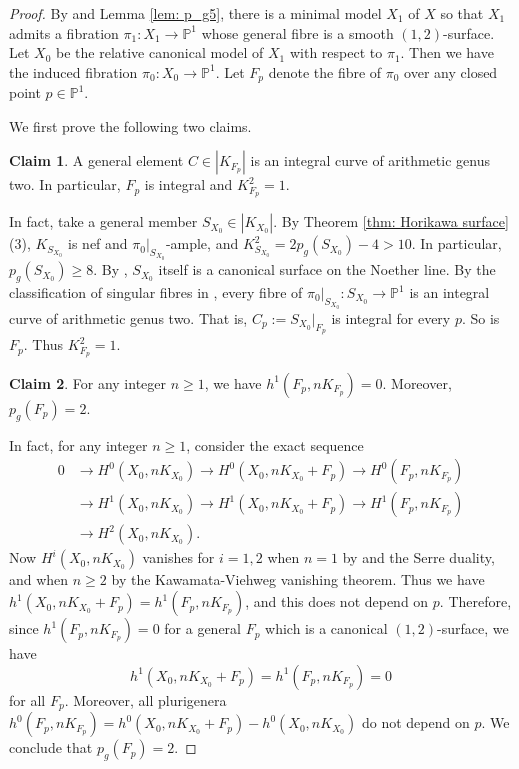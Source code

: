 \documentclass[a4paper,11pt]{amsart}
\newcommand{\PP}{\ensuremath{\mathbb{P}}}
\theoremstyle{definition}
\theoremstyle{remark}
\numberwithin{equation}{section}
\begin{document}
\begin{proof}
	By \cite[Proposition 2.1]{HZ} and Lemma \ref{lem: p_g5}, there is a minimal model $X_1$ of $X$ so that $X_1$ admits a fibration $\pi_1 \colon X_1\to \PP^1$ whose general fibre is a smooth $(1,2)$-surface. Let $X_0$ be the relative canonical model of $X_1$ with respect to $\pi_1$. Then we have the induced fibration $\pi_0: X_0 \to \PP^1$. Let $F_p$ denote the fibre of $\pi_0$ over any closed point $p \in \PP^1$. 
	
	We first prove the following two claims.
	
	\textbf{Claim 1}. A general element $C \in |K_{F_p}|$ is an integral curve of arithmetic genus two. In particular, $F_p$ is integral and $K_{F_p}^2 = 1$.
	
	In fact, take a general member $S_{X_0} \in |K_{X_0}|$. By Theorem \ref{thm: Horikawa surface} (3), $K_{S_{X_0}}$ is nef and $\pi_0|_{S_{X_0}}$-ample, and $K_{S_{X_0}}^2 = 2p_g(S_{X_0}) - 4 > 10$. In particular, $p_g(S_{X_0}) \ge 8$. By \cite[\S 1]{Horikawa1}, $S_{X_0}$ itself is a canonical surface on the Noether line. By the classification of singular fibres in \cite{Horikawagenus2}, every fibre of $\pi_0|_{S_{X_0}}: S_{X_0} \to \PP^1$ is an integral curve of arithmetic genus two. That is, $C_p := S_{X_0}|_{F_p}$ is integral for every $p$. So is $F_p$. Thus $K_{F_p}^2 = 1$.
	
	\textbf{Claim 2}. For any integer $n \ge 1$, we have $h^1(F_p, nK_{F_p}) = 0$. Moreover, $p_g(F_p) = 2$.
	
	In fact, for any integer $n \ge 1$, consider the exact sequence
	\begin{equation}\label{eq: exact-sequence}
		\begin{split}
			0 &\to H^0(X_0, nK_{X_0})\to H^0(X_0, nK_{X_0}+F_p)\to H^0(F_p, nK_{F_p})\\
			& \to H^1(X_0, nK_{X_0})\to H^1(X_0, nK_{X_0}+F_p)\to H^1(F_p, nK_{F_p})\\
			& \to H^2(X_0, nK_{X_0}).
		\end{split}
	\end{equation}
	Now $H^i(X_0, nK_{X_0})$ vanishes for $i = 1, 2$ when $n=1$ by \cite[Lemma 3.4]{HZ} and the Serre duality, and when $n \ge 2$ by the Kawamata-Viehweg vanishing theorem. Thus we have $h^1(X_0, nK_{X_0} + F_p) = h^1(F_p, nK_{F_p})$, and this does not depend on $p$. Therefore, since $h^1(F_p,nK_{F_p}) = 0$ for a general $F_p$ which is a canonical $(1, 2)$-surface, we have 
	$$
	h^1(X_0, nK_{X_0}+F_p) = h^1(F_p, nK_{F_p}) = 0
	$$ 
	for all $F_p$. Moreover, all plurigenera $h^0(F_p, nK_{F_p}) = h^0(X_0, nK_{X_0} + F_p) - h^0(X_0, nK_{X_0})$ do not depend on $p$. We conclude that $p_g(F_p) = 2$.


\end{proof}
\end{document}
